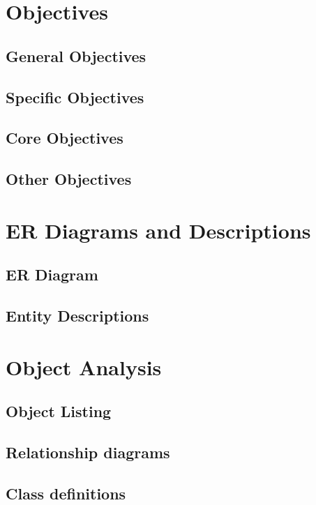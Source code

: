 \section{Objectives}

\subsection{General Objectives}

\subsection{Specific Objectives}

\subsection{Core Objectives}

\subsection{Other Objectives}

\section{ER Diagrams and Descriptions}

\subsection{ER Diagram}

\subsection{Entity Descriptions}

\section{Object Analysis}

\subsection{Object Listing}

\subsection{Relationship diagrams}

\subsection{Class definitions}

